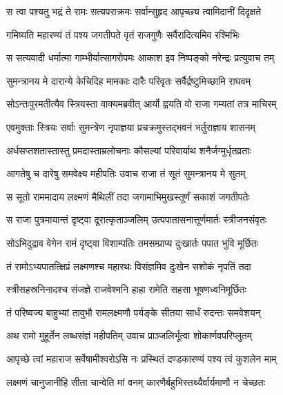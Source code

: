 \twolineshloka
{स त्वा पश्यतु भद्रं ते रामः सत्यपराक्रमः}
{सर्वान्सुहृद आपृच्छ्य त्वामिदानीं दिदृक्षते} %

\twolineshloka
{गमिष्यति महारण्यं तं पश्य जगतीपते}
{वृतं राजगुणैः सर्वैरादित्यमिव रश्मिभिः} %

\twolineshloka
{स सत्यवादी धर्मात्मा गाम्भीर्यात्सागरोपमः}
{आकाश इव निष्पङ्को नरेन्द्रः प्रत्युवाच तम्} %

\twolineshloka
{सुमन्त्रानय मे दारान्ये केचिदिह मामकाः}
{दारैः परिवृतः सर्वैर्द्रष्टुमिच्छामि राघवम्} %

\twolineshloka
{सोऽन्तःपुरमतीत्यैव स्त्रियस्ता वाक्यमब्रवीत्}
{आर्यो ह्वयति वो राजा गम्यतां तत्र माचिरम्} %

\twolineshloka
{एवमुक्ताः स्त्रियः सर्वाः सुमन्त्रेण नृपाज्ञया}
{प्रचक्रमुस्तद्भवनं भर्तुराज्ञाय शासनम्} %

\twolineshloka
{अर्धसप्तशतास्तास्तु प्रमदास्ताम्रलोचनाः}
{कौसल्यां परिवार्याथ शनैर्जग्मुर्धृतव्रताः} %

\twolineshloka
{आगतेषु च दारेषु समवेक्ष्य महीपतिः}
{उवाच राजा तं सूतं सुमन्त्रानय मे सुतम्} %

\twolineshloka
{स सूतो राममादाय लक्ष्मणं मैथिलीं तदा}
{जगामाभिमुखस्तूर्णं सकाशं जगतीपतेः} %

\twolineshloka
{स राजा पुत्रमायान्तं दृष्ट्वा दूरात्कृताञ्जलिम्}
{उत्पपातासनात्तूर्णमार्तः स्त्रीजनसंवृतः} %

\twolineshloka
{सोऽभिदुद्राव वेगेन रामं दृष्ट्वा विशाम्पतिः}
{तमसम्प्राप्य दुःखार्तः पपात भुवि मूर्छितः} %

\twolineshloka
{तं रामोऽभ्यपातत्क्षिप्रं लक्ष्मणश्च महारथः}
{विसंज्ञमिव दुःखेन सशोकं नृपतिं तदा} %

\twolineshloka
{स्त्रीसहस्रनिनादश्च संजज्ञे राजवेश्मनि}
{हाहा रामेति सहसा भूषणध्वनिमूर्छितः} %

\twolineshloka
{तं परिष्वज्य बाहुभ्यां तावुभौ रामलक्ष्मणौ}
{पर्यङ्के सीतया सार्धं रुदन्तः समवेशयन्} %

\twolineshloka
{अथ रामो मुहूर्तेन लब्धसंज्ञं महीपतिम्}
{उवाच प्राञ्जलिर्भूत्वा शोकार्णवपरिप्लुतम्} %

\twolineshloka
{आपृच्छे त्वां महाराज सर्वेषामीश्वरोऽसि नः}
{प्रस्थितं दण्डकारण्यं पश्य त्वं कुशलेन माम्} %

\twolineshloka
{लक्ष्मणं चानुजानीहि सीता चान्वेति मां वनम्}
{कारणैर्बहुभिस्तथ्यैर्वार्यमाणौ न चेच्छतः} %

